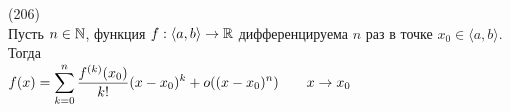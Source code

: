 (206)\\
Пусть $n \in \mathbb{N}$, функция $f: \langle a, b\rangle \to \mathbb{R}$ дифференцируема $n$ раз в точке $x_0 \in \langle a, b\rangle$. Тогда\\
$f(x) = \displaystyle\sum\limits^{n}_{k = 0} \frac{f^{(k)}(x_0)}{k!}(x - x_0)^k + o((x - x_0)^n) \qquad x\to x_0$